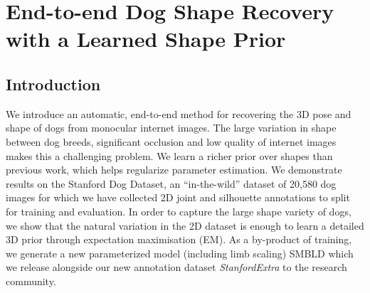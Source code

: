 \chapter{End-to-end Dog Shape Recovery with a Learned Shape Prior}

\ifpdf
    \graphicspath{{Chapter5/Figs/Raster/}{Chapter5/Figs/PDF/}{Chapter5/Figs/}}
\else
    \graphicspath{{Chapter5/Figs/Vector/}{Chapter5/Figs/}}
\fi





\section{Introduction}
We introduce an automatic, end-to-end method for recovering the 3D pose and shape of dogs from monocular internet images. 
The large variation in shape between dog breeds, significant occlusion and low quality of internet images makes this a challenging problem.
We learn a richer prior over shapes than previous work, which helps regularize parameter estimation.
We demonstrate results on the Stanford Dog Dataset, an ``in-the-wild'' dataset of 20,580 dog images for which we have collected 2D joint and silhouette annotations to split for training and evaluation. 
In order to capture the large shape variety of dogs, we show that the natural variation in the 2D dataset is enough to learn a detailed 3D prior through expectation maximisation (EM).
As a by-product of training, we generate a new parameterized model (including limb scaling) SMBLD which we release alongside our new annotation dataset \emph{StanfordExtra} to the research community.


